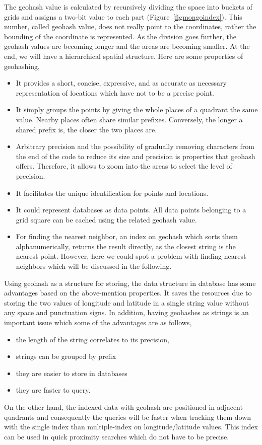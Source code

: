 \documentclass[a4paper,12pt]{article}
\begin{document}
The geohash value is calculated by recursively dividing the space into buckets of grids and assigns a two-bit value to each part (Figure~\ref{figmongoindex}). This number, called geohash value, does not really point to the coordinates, rather the bounding of the coordinate is represented. 
As the division goes further, the geohash values are becoming longer and the areas are becoming smaller. 
At the end, we will have a hierarchical spatial structure. Here are some properties of geohashing,
\begin{itemize}
\item It provides a short, concise, expressive, and as accurate as necessary representation of locations which have not to be a precise point.
\item It simply groups the points by giving the whole places of a quadrant the same value. Nearby places often share similar prefixes. Conversely, the longer a shared prefix is, the closer the two places are. 
\item Arbitrary precision and the possibility of gradually removing characters from the end of the code to reduce its size and precision is properties that geohash offers. Therefore, it allows to zoom into the areas to select the level of precision.
\item It facilitates the unique identification for points and locations.
\item It could represent databases as data points. All data points belonging to a grid square can be cached using the related geohash value.
\item For finding the nearest neighbor, an index on geohash which sorts them alphanumerically, returns the result directly, as the closest string is the nearest point. However, here we could spot a problem with finding nearest neighbors which will be discussed in the following.
\end{itemize}

Using geohash as a structure for storing, the data structure in database has some advantages based on the above-mention properties. It saves the resources due to storing the two values of longitude and latitude in a single string value without any space and punctuation signs. 
In addition, having geohashes as strings is an important issue which some of the advantages are as follows, 
\begin{itemize}
\item the length of the string correlates to its precision,
\item strings can be grouped by prefix
\item  they are easier to store in databases
\item  they are faster to query. 
\end{itemize}
On the other hand, the indexed data with geohash are positioned in adjacent quadrants and consequently the queries will be faster when tracking them down with the single index than multiple-index on longitude/latitude values. This index can be used in quick proximity searches which do not have to be precise.
\end{document}
